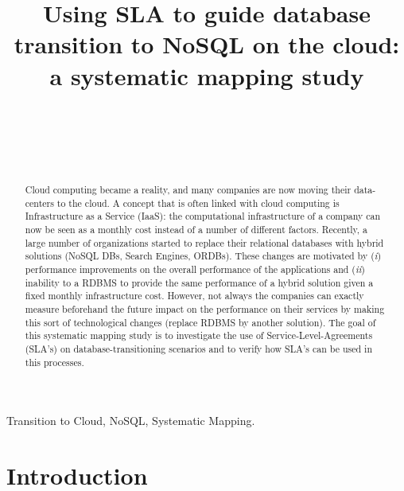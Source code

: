 \documentclass[a4paper]{IEEEtran}
\begin{document}
\title{Using SLA to guide database transition to NoSQL on the cloud: a systematic mapping study}

\author{
\\
\and\\[1mm]
\\
}

\maketitle  


\begin{abstract}
Cloud computing became a reality, and many companies are now moving their data-centers to the cloud. 
A concept that is often linked with cloud computing is Infrastructure as a Service (IaaS): the computational infrastructure of a company can now be seen as a monthly cost instead of a number of different factors. 
Recently, a large number of organizations started to replace their relational databases with hybrid solutions (NoSQL DBs, Search Engines, ORDBs). 
These changes are motivated by (\textit{i}) performance improvements on the overall performance of the applications and (\textit{ii}) inability to a RDBMS to provide the same performance of a hybrid solution given a fixed monthly infrastructure cost. 
However, not always the companies can exactly measure beforehand the future impact on the performance on their services by making this sort of technological changes (replace RDBMS by another solution). 
The goal of this systematic mapping study is to investigate the use of Service-Level-Agreements (SLA’s) on database-transitioning scenarios and to verify how SLA’s can be used in this processes.
\end{abstract}

\begin{IEEEkeywords}
Transition to Cloud, NoSQL, Systematic Mapping.
\end{IEEEkeywords}

\section{Introduction}
\end{document}
